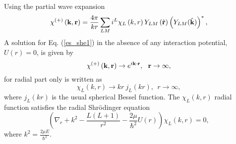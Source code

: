 \documentclass[
12pt, %
oneside, %
english, %
onehalfspacing, %
onehalfspacing, %
headsepline, %
]{MastersDoctoralThesis} %
\begin{document}
Using the partial wave expansion 
\begin{equation}
\chi^{(+)} \left( {\bf k}, {\bf r} \right) = 
\frac{4 \pi}{kr} \sum_{LM} i^{L} \chi_L \left( k,r \right) 
Y_{LM}\left( \hat{{\bf r}}\right) \left( Y_{LM}( \hat{{\bf k}})\right)^{*},
\end{equation}
A solution for Eq. (\ref{es_she1}) in the absence of any interaction potential, $U \left( r \right) = 0$, is given by 
\begin{equation}
\chi^{(+)} \left( {\bf k}, {\bf r} \right) \rightarrow
e^{i {\bf k} \cdot {\bf r}}, ~~ {\bf r} \rightarrow \infty, 
\end{equation}
for radial part only is written as
\begin{equation}
\chi_L \left( k,r \right)  \rightarrow kr~j_L \left(kr \right),
~~ r \rightarrow \infty,
\end{equation}
where $j_L \left(kr \right)$ is the usual spherical Bessel function. The $\chi_L \left( k,r \right)$ radial function satisfies the radial Shr\"{o}dinger equation
\begin{equation}
\left( \nabla_r + k^2 - \frac{L(L+1)}{r^2} - \frac{2 \mu}{\hbar^2} U \left( r \right)\right) \chi_L \left( k,r \right) =0,
\label{es_she_radial}
\end{equation}
where $k^2 = \frac{2\mu E}{\hbar^2}$.
\end{document}
